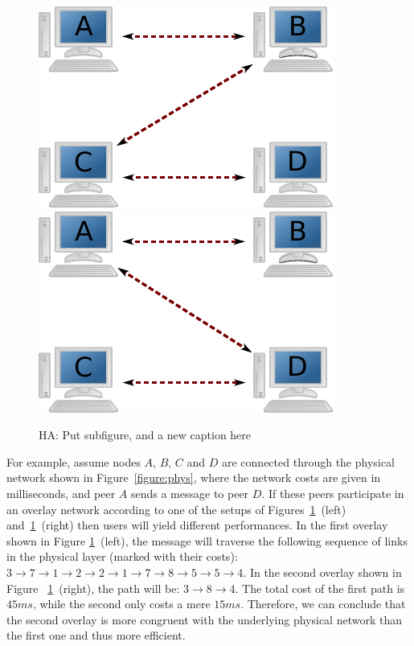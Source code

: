 \documentclass[acmcsur]{acmtrans2m}
\begin{document}
\begin{figure}
\centering
  \includegraphics[scale=0.8]{img/over1.pdf}
  \hspace{3ex}
  \vline
  \hspace{3ex}
  \includegraphics[scale=0.8]{img/over2.pdf}
\caption{HA: Put subfigure, and a new caption here}
\label{figure:over1}
\end{figure}

For example, assume nodes $A$, $B$, $C$ and $D$ are connected through the
physical network shown in Figure~\ref{figure:phys}, where the network costs are
given in milliseconds, and peer $A$ sends a message to peer $D$. If these peers
participate in an overlay network according to one of the setups of
Figures~\ref{figure:over1}~(left) and~\ref{figure:over1}~(right) then users will
yield different performances. In the first overlay shown in Figure
\ref{figure:over1}~(left), the message will traverse the following sequence of
links in the physical layer (marked with their costs): $3 \rightarrow 7
\rightarrow 1 \rightarrow 2 \rightarrow 2 \rightarrow 1 \rightarrow 7
\rightarrow 8 \rightarrow 5 \rightarrow 5 \rightarrow 4$. In the second overlay
shown in Figure ~\ref{figure:over1}~(right), the path will be: $3 \rightarrow 8
\rightarrow 4$. The total cost of the first path is $45 ms$, while the second
only costs a mere $15 ms$. Therefore, we can conclude that the second overlay is
more congruent with the underlying physical network than the first one and thus
more efficient.
\end{document}
